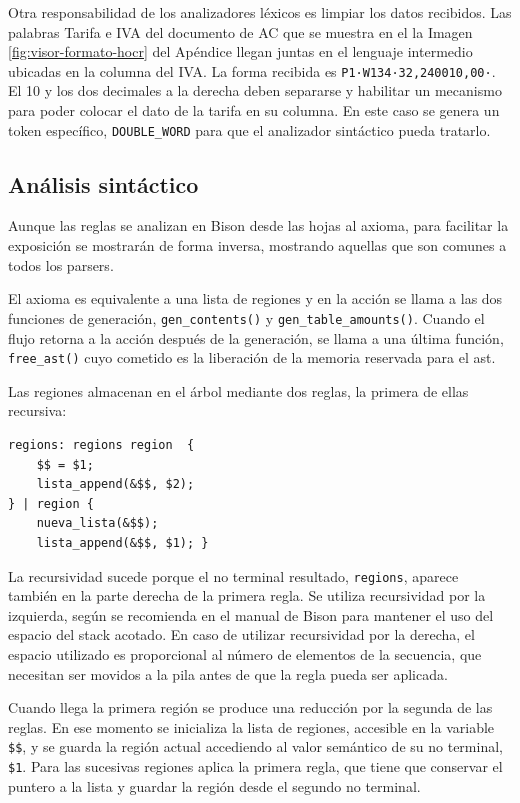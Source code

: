 Otra responsabilidad de los analizadores léxicos es limpiar los datos recibidos. Las palabras Tarifa e IVA del documento de AC que se muestra en el la Imagen \ref{fig:visor-formato-hocr} del Apéndice llegan juntas en el lenguaje intermedio ubicadas en la columna del IVA. La forma recibida es \verb|P1·W134·32,240010,00·|. El 10 y los dos decimales a la derecha deben separarse y habilitar un mecanismo para poder colocar el dato de la tarifa en su columna. En este caso se genera un token específico, \verb|DOUBLE_WORD| para que el analizador sintáctico pueda tratarlo.

\subsection{Análisis sintáctico}

Aunque las reglas se analizan en Bison desde las hojas al axioma, para facilitar la exposición se mostrarán de forma inversa, mostrando aquellas que son comunes a todos los parsers.

El axioma es equivalente a una lista de regiones y en la acción se llama a las dos funciones de generación, \verb|gen_contents()| y \verb|gen_table_amounts()|. Cuando el flujo retorna a la acción después de la generación, se llama a una última función, \verb|free_ast()| cuyo cometido es la liberación de la memoria reservada para el \acrshort{ast}.

Las regiones almacenan en el árbol mediante dos reglas, la primera de ellas recursiva:

\begin{lstlisting}[caption={},label={}]
regions: regions region  {
    $$ = $1;
    lista_append(&$$, $2);
} | region {
    nueva_lista(&$$);
    lista_append(&$$, $1); }
\end{lstlisting}

La recursividad sucede porque el no terminal resultado, \verb|regions|, aparece también en la parte derecha de la primera regla. Se utiliza recursividad por la izquierda, según se recomienda en el manual de Bison para mantener el uso del espacio del stack acotado. En caso de utilizar recursividad por la derecha, el espacio utilizado es proporcional al número de elementos de la secuencia, que necesitan ser movidos a la pila antes de que la regla pueda ser aplicada.

Cuando llega la primera región se produce una reducción por la segunda de las reglas. En ese momento se inicializa la lista de regiones, accesible en la variable \verb|$$|, y se  guarda la región actual accediendo al valor semántico de su no terminal, \verb|$1|. Para las sucesivas regiones aplica la primera regla, que tiene que conservar el puntero a la lista y guardar la región desde el segundo no terminal.

